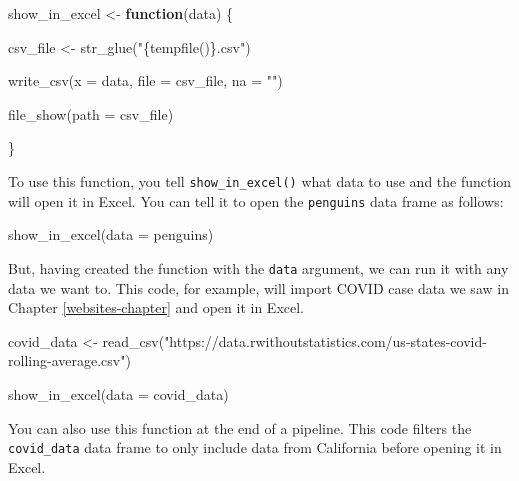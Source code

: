 \documentclass[
]{book}
\newenvironment{Shaded}{\begin{snugshade}}{\end{snugshade}}
\newcommand{\AttributeTok}[1]{\textcolor[rgb]{0.77,0.63,0.00}{#1}}
\newcommand{\ControlFlowTok}[1]{\textcolor[rgb]{0.13,0.29,0.53}{\textbf{#1}}}
\newcommand{\FunctionTok}[1]{\textcolor[rgb]{0.00,0.00,0.00}{#1}}
\newcommand{\NormalTok}[1]{#1}
\newcommand{\OtherTok}[1]{\textcolor[rgb]{0.56,0.35,0.01}{#1}}
\newcommand{\StringTok}[1]{\textcolor[rgb]{0.31,0.60,0.02}{#1}}
\begin{document}
\begin{Shaded}
\begin{Highlighting}[]
\NormalTok{show\_in\_excel }\OtherTok{\textless{}{-}} \ControlFlowTok{function}\NormalTok{(data) \{}
  
\NormalTok{  csv\_file }\OtherTok{\textless{}{-}} \FunctionTok{str\_glue}\NormalTok{(}\StringTok{"\{tempfile()\}.csv"}\NormalTok{)}
  
  \FunctionTok{write\_csv}\NormalTok{(}\AttributeTok{x =}\NormalTok{ data,}
            \AttributeTok{file =}\NormalTok{ csv\_file,}
            \AttributeTok{na =} \StringTok{""}\NormalTok{)}
  
  \FunctionTok{file\_show}\NormalTok{(}\AttributeTok{path =}\NormalTok{ csv\_file)}
  
\NormalTok{\}}
\end{Highlighting}
\end{Shaded}

To use this function, you tell \texttt{show\_in\_excel()} what data to use and the function will open it in Excel. You can tell it to open the \texttt{penguins} data frame as follows:

\begin{Shaded}
\begin{Highlighting}[]
\FunctionTok{show\_in\_excel}\NormalTok{(}\AttributeTok{data =}\NormalTok{ penguins)}
\end{Highlighting}
\end{Shaded}

But, having created the function with the \texttt{data} argument, we can run it with any data we want to. This code, for example, will import COVID case data we saw in Chapter \ref{websites-chapter} and open it in Excel.

\begin{Shaded}
\begin{Highlighting}[]
\NormalTok{covid\_data }\OtherTok{\textless{}{-}} \FunctionTok{read\_csv}\NormalTok{(}\StringTok{"https://data.rwithoutstatistics.com/us{-}states{-}covid{-}rolling{-}average.csv"}\NormalTok{)}

\FunctionTok{show\_in\_excel}\NormalTok{(}\AttributeTok{data =}\NormalTok{ covid\_data)}
\end{Highlighting}
\end{Shaded}

You can also use this function at the end of a pipeline. This code filters the \texttt{covid\_data} data frame to only include data from California before opening it in Excel.
\end{document}

